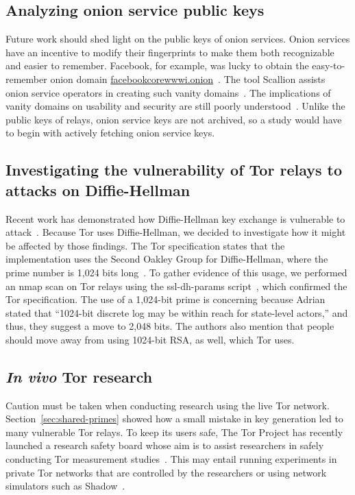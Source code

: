 \subsection{Analyzing onion service public keys}
Future work should shed light on the public keys of onion services.  Onion
services have an incentive to modify their fingerprints to make them both
recognizable and easier to remember.  Facebook, for example, was lucky to
obtain the easy-to-remember onion domain
\url{facebookcorewwwi.onion}~\cite{facebook}.  The tool Scallion assists onion
service operators in creating such vanity domains~\cite{scallion}.  The
implications of vanity domains on usability and security are still poorly
understood~\cite{vanity-domains}.  Unlike the public keys of relays, onion
service keys are not archived, so a study would have to begin with actively
fetching onion service keys.

\subsection{Investigating the vulnerability of Tor relays to attacks on Diffie-Hellman}
Recent work has demonstrated how Diffie-Hellman key exchange is vulnerable to
attack~\cite{Adrian2015a,Valenta2017a,Dorey2017a}.  Because Tor uses
Diffie-Hellman, we decided to investigate how it might be affected by those
findings.  The Tor specification states that the implementation uses the Second
Oakley Group for Diffie-Hellman, where the prime number is 1,024 bits
long~\cite[\S~0.3]{torspec}. To gather evidence of this usage, we performed an
nmap scan on Tor relays using the ssl-dh-params script~\cite{nmapdhscript},
which confirmed the Tor specification. The use of a 1,024-bit prime is
concerning because Adrian \ea~\cite{Adrian2015a} stated that ``1024-bit discrete
log may be within reach for state-level actors,'' and thus, they suggest a move
to 2,048 bits. The authors also mention that people should move away from using
1024-bit RSA, as well, which Tor uses.

\subsection{\textit{In vivo} Tor research}
Caution must be taken when conducting research using the live Tor network.
Section~\ref{sec:shared-primes} showed how a small mistake in key generation led
to many vulnerable Tor relays.  To keep its users safe, The Tor Project has
recently launched a research safety board whose aim is to assist researchers in
safely conducting Tor measurement studies~\cite{safety-board}.  This may entail
running experiments in private Tor networks that are controlled by the
researchers or using network simulators such as Shadow~\cite{Jansen2012a}.

